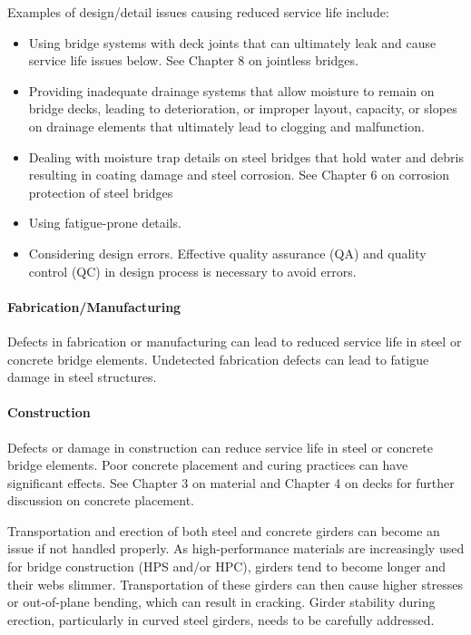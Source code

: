 Examples of design/detail issues causing reduced service life include:
\begin{itemize}
  \item Using bridge systems with deck joints that can ultimately leak and cause service life issues below. See
  Chapter 8 on jointless bridges.
  \item Providing inadequate drainage systems that allow moisture to remain on bridge decks, leading to
  deterioration, or improper layout, capacity, or slopes on drainage elements that ultimately lead to clogging
  and malfunction.
  \item Dealing with moisture trap details on steel bridges that hold water and debris resulting in coating damage and
  steel corrosion. See Chapter 6 on corrosion protection of steel bridges
  \item Using fatigue-prone details.
  \item Considering design errors. Effective quality assurance (QA) and quality control (QC) in design process is
  necessary to avoid errors.
\end{itemize}

\paragraph{Fabrication/Manufacturing}
Defects in fabrication or manufacturing can lead to reduced service life in steel or concrete bridge elements.
Undetected fabrication defects can lead to fatigue damage in steel structures.

\paragraph{Construction}
Defects or damage in construction can reduce service life in steel or concrete bridge elements. Poor concrete
placement and curing practices can have significant effects. See Chapter 3 on material and Chapter 4 on decks for
further discussion on concrete placement.

Transportation and erection of both steel and concrete girders can become an issue if not handled properly. As
high-performance materials are increasingly used for bridge construction (HPS and/or HPC), girders tend to become
longer and their webs slimmer. Transportation of these girders can then cause higher stresses or out-of-plane
bending, which can result in cracking. Girder stability during erection, particularly in curved steel girders, needs to
be carefully addressed.


